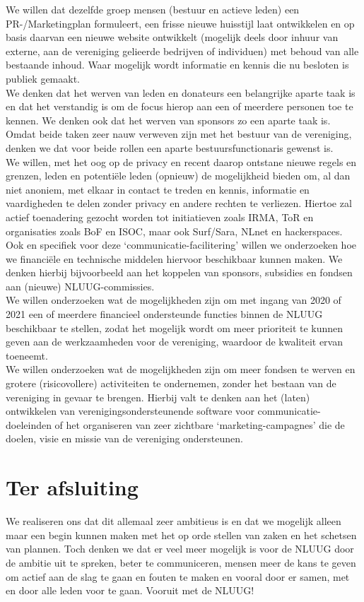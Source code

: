 \documentclass{article}
\begin{document}
We willen dat dezelfde groep mensen (bestuur en actieve leden) een PR-/Marketingplan formuleert, een frisse nieuwe huisstijl laat ontwikkelen en op basis daarvan een nieuwe website ontwikkelt (mogelijk deels door inhuur van externe, aan de vereniging gelieerde bedrijven of individuen) met behoud van alle bestaande inhoud. Waar mogelijk wordt informatie en kennis die nu besloten is publiek gemaakt. \\

We denken dat het werven van leden en donateurs een belangrijke aparte taak is en dat het verstandig is om de focus hierop aan een of meerdere personen toe te kennen. We denken ook dat het werven van sponsors zo een aparte taak is. Omdat beide taken zeer nauw verweven zijn met het bestuur van de vereniging, denken we dat voor beide rollen een aparte bestuursfunctionaris gewenst is. \\

We willen, met het oog op de privacy en recent daarop ontstane nieuwe regels en grenzen, leden en potenti\"ele leden (opnieuw) de mogelijkheid bieden om, al dan niet anoniem, met elkaar in contact te treden en kennis, informatie en vaardigheden te delen zonder privacy en andere rechten te verliezen. Hiertoe zal actief toenadering gezocht worden tot initiatieven zoals IRMA, ToR en organisaties zoals BoF en ISOC, maar ook Surf/Sara, NLnet en hackerspaces. Ook en specifiek voor deze `communicatie-facilitering' willen we onderzoeken hoe we financi\"ele en technische middelen hiervoor beschikbaar kunnen maken. We denken hierbij bijvoorbeeld aan het koppelen van sponsors, subsidies en fondsen aan (nieuwe) NLUUG-commissies. \\

We willen onderzoeken wat de mogelijkheden zijn om met ingang van 2020 of 2021 een of meerdere financieel ondersteunde functies binnen de NLUUG beschikbaar te stellen, zodat het mogelijk wordt om meer prioriteit te kunnen geven aan de werkzaamheden voor de vereniging, waardoor de kwaliteit ervan toeneemt. \\

We willen onderzoeken wat de mogelijkheden zijn om meer fondsen te werven en grotere (risicovollere) activiteiten te ondernemen, zonder het bestaan van de vereniging in gevaar te brengen. Hierbij valt te denken aan het (laten) ontwikkelen van verenigingsondersteunende software voor communicatie-doeleinden of het organiseren van zeer zichtbare `marketing-campagnes' die de doelen, visie en missie van de vereniging ondersteunen. \\

\section{Ter afsluiting}
We realiseren ons dat dit allemaal zeer ambitieus is en dat we mogelijk alleen maar een begin kunnen maken met het op orde stellen van zaken en het schetsen van plannen. Toch denken we dat er veel meer mogelijk is voor de NLUUG door de ambitie uit te spreken, beter te communiceren, mensen meer de kans te geven om actief aan de slag te gaan en fouten te maken en vooral door er samen, met en door alle leden voor te gaan. Vooruit met de NLUUG!
\end{document}
